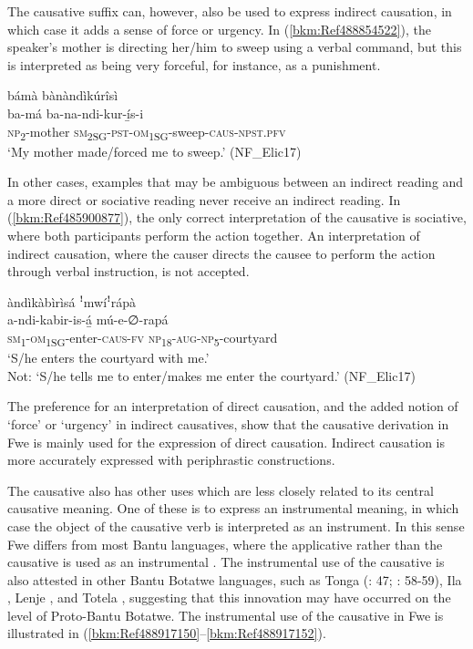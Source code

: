 The causative suffix can, however, also be used to express indirect causation, in which case it adds a sense of force or urgency. In (\ref{bkm:Ref488854522}), the speaker’s mother is directing her/him to sweep using a verbal command, but this is interpreted as being very forceful, for instance, as a punishment.

\ea
\label{bkm:Ref488854522}
bámà bànàndìkúrîsì\\
\gll ba-má    ba-na-ndi-kur-í̲s-i\\
\textsc{np}\textsubscript{2}-mother  \textsc{sm}\textsubscript{2SG}-\textsc{pst}-\textsc{om}\textsubscript{1SG}-sweep-\textsc{caus}-\textsc{npst}.\textsc{pfv}\\
\glt ‘My mother made/forced me to sweep.’ (NF\_Elic17)
\z

In other cases, examples that may be ambiguous between an indirect reading and a more direct or sociative reading never receive an indirect reading. In (\ref{bkm:Ref485900877}), the only correct interpretation of the causative is sociative, where both participants perform the action together. An interpretation of indirect causation, where the causer directs the causee to perform the action through verbal instruction, is not accepted.

\ea
\label{bkm:Ref485900877}
àndìkàbìrìsá ꜝmwíꜝrápà\\
\gll a-ndi-kabir-is-á̲    mú-e-∅-rapá\\
\textsc{sm}\textsubscript{1}-\textsc{om}\textsubscript{1SG}-enter-\textsc{caus}-\textsc{fv}  \textsc{np}\textsubscript{18}-\textsc{aug}-\textsc{np}\textsubscript{5}-courtyard\\
\glt ‘S/he enters the courtyard with me.’ \\
Not: ‘S/he tells me to enter/makes me enter the courtyard.’ (NF\_Elic17)
\z

The preference for an interpretation of direct causation, and the added notion of ‘force’ or ‘urgency’ in indirect causatives, show that the causative derivation in Fwe is mainly used for the expression of direct causation. Indirect causation is more accurately expressed with periphrastic constructions.

The causative also has other uses which are less closely related to its central causative meaning. One of these is to express an instrumental meaning, in which case the object of the causative verb is interpreted as an instrument. In this sense Fwe differs from most Bantu languages, where the applicative rather than the causative is used as an instrumental \citep{Jerro2017}. The instrumental use of the causative is also attested in other Bantu Botatwe languages, such as Tonga (\citealt{Carter2002}: 47; \citealt{Collins1962}: 58-59), Ila \citep[123-127]{Smith1964}, Lenje \citep[47]{Madan1908}, and Totela \citep[669]{Crane2019}, suggesting that this innovation may have occurred on the level of Proto-Bantu Botatwe. The instrumental use of the causative in Fwe is illustrated in (\ref{bkm:Ref488917150}--\ref{bkm:Ref488917152}).

